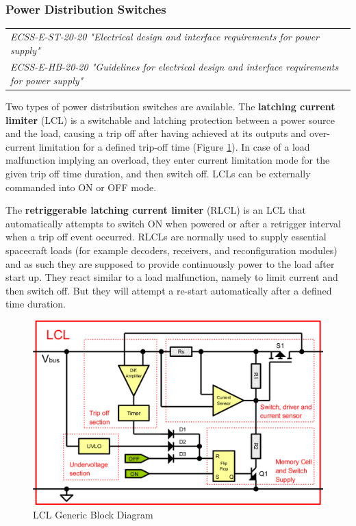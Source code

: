 \subsubsection{Power Distribution Switches}

\begin{tabular}{l}
\textit{ECSS-E-ST-20-20 "Electrical design and interface requirements for power supply" \cite{ECSS-E-ST-20-20}} \\
\textit{ECSS-E-HB-20-20 "Guidelines for electrical design and interface requirements for power supply" \cite{ECSS-E-HB-20-20}} \\
\end{tabular}

Two types of power distribution switches are available. The \textbf{latching current limiter} (LCL) is a switchable and latching protection between a power source and the load, causing a trip off after having achieved at its outputs and over-current limitation for a defined trip-off time (Figure \ref{fig:LCL Generic Block Diagram}). In case of a load malfunction implying an overload, they enter current limitation mode for the given trip off time duration, and then switch off. LCLs can be externally commanded into ON or OFF mode.

The \textbf{retriggerable latching current limiter} (RLCL) is an LCL that automatically attempts to switch ON when powered or after a retrigger interval when a trip off event occurred. RLCLs are normally used to supply essential spacecraft loads (for example decoders, receivers, and reconfiguration modules) and as such they are supposed to provide continuously power to the load after start up. They react similar to a load malfunction, namely to limit current and then switch off. But they will attempt a re-start automatically after a defined time duration.

\begin{figure}[h]
\centering\includegraphics[scale=0.2]{fig/lcl_generic_block_diagram}
\caption{LCL Generic Block Diagram}
\label{fig:LCL Generic Block Diagram}
\end{figure}

